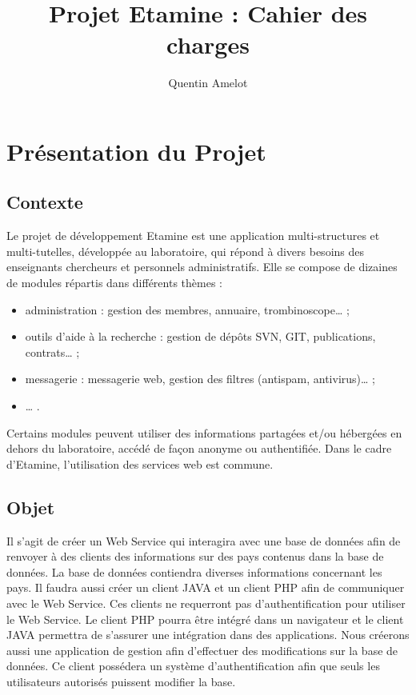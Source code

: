 \documentclass[12pt,a4paper,article]{memoir} %
\title{Projet Etamine : Cahier des charges}
\author{Quentin Amelot}
\date{} %
\begin{document}
\maketitle
\clearpage
\tableofcontents %

\chapter{Présentation du Projet}

\section{Contexte}
Le projet de développement Etamine est une application multi-structures et multi-tutelles,
développée au laboratoire, qui répond à divers besoins des enseignants chercheurs et
personnels administratifs.
Elle se compose de dizaines de modules répartis dans différents thèmes :
\begin{itemize}
\item administration : gestion des membres, annuaire, trombinoscope… ;
\item outils d’aide à la recherche : gestion de dépôts SVN, GIT, publications, contrats… ; 
\item messagerie : messagerie web, gestion des filtres (antispam, antivirus)… ;
\item … .
 \end{itemize}
Certains modules peuvent utiliser des informations partagées et/ou hébergées en dehors du
laboratoire, accédé de façon anonyme ou authentifiée. Dans le cadre d’Etamine, l’utilisation
des services web est commune.

\section{Objet}
Il s’agit de créer un Web Service qui interagira avec une base de données afin de renvoyer à
des clients des informations sur des pays contenus dans la base de données.
La base de données contiendra diverses informations concernant les pays.
Il faudra aussi créer un client JAVA et un client PHP afin de communiquer avec le Web Service.
Ces clients ne requerront pas d’authentification pour utiliser le Web Service. Le client PHP
pourra être intégré dans un navigateur et le client JAVA permettra de s’assurer une intégration
dans des applications.
Nous créerons aussi une application de gestion afin d’effectuer des modifications sur la base
de données.
Ce client possédera un système d’authentification afin que seuls les utilisateurs autorisés
puissent modifier la base.
\end{document}
